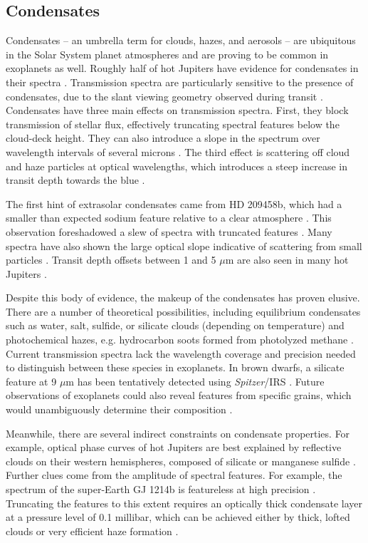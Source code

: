 \documentclass[graybox,natbib,nosecnum]{svmult}
\newcommand{\project}[1]{\textsl{#1}}
\newcommand{\Spitzer}{\project{Spitzer}}
\begin{document}
\subsection{Condensates}
Condensates -- an umbrella term for clouds, hazes, and aerosols -- are ubiquitous in the Solar System planet atmospheres and are proving to be common in exoplanets as well. Roughly half of hot Jupiters have evidence for condensates in their spectra \citep{sing16}. Transmission spectra are particularly sensitive to the presence of condensates, due to the slant viewing geometry observed during transit \citep{fortney05}.  Condensates have three main effects on transmission spectra.  First, they block transmission of stellar flux, effectively truncating spectral features below the cloud-deck height.  They can also introduce a slope in the spectrum over wavelength intervals of several microns \citep[e.g][]{sing16}.  The third effect is scattering off cloud and haze particles at optical wavelengths, which introduces a steep increase in transit depth towards the blue \citep[e.g.][]{pont08}.

The first hint of extrasolar condensates came from HD 209458b, which had a smaller than expected sodium feature relative to a clear atmosphere \citep{charbonneau02}. This observation foreshadowed a slew of spectra with truncated features \citep[e.g.][]{deming13, crossfield13, kreidberg14a, knutson14a, kreidberg15b}. Many spectra have also shown the large optical slope indicative of scattering from small particles \citep[e.g][]{lecavelier08b, sing11, sing13, robinson14, dragomir15}. Transit depth offsets between 1 and 5 $\mu$m are also seen in many hot Jupiters \citep{sing16}.

Despite this body of evidence, the makeup of the condensates has proven elusive. There are a number of theoretical possibilities, including equilibrium condensates such as water, salt, sulfide, or silicate clouds (depending on temperature) and photochemical hazes, e.g. hydrocarbon soots formed from photolyzed methane \citep{burrows99, kempton12, morley13, wakeford17}. Current transmission spectra lack the wavelength coverage and precision needed to distinguish between these species in exoplanets.  In brown dwarfs, a silicate feature at 9 $\mu$m has been tentatively detected using \Spitzer/IRS \citep{cushing06}. Future observations of exoplanets could also reveal features from specific grains, which would unambiguously determine their composition \citep{wakeford15}.

Meanwhile, there are several indirect constraints on condensate properties.  For example, optical phase curves of hot Jupiters are best explained by reflective clouds on their western hemispheres, composed of silicate or manganese sulfide \citep{demory13, oreshenko16, parmentier16}. Further clues come from the amplitude of spectral features. For example, the spectrum of the super-Earth GJ 1214b is featureless at high precision \citep[30 ppm,][]{kreidberg14a}.  Truncating the features to this extent requires an optically thick condensate layer at a pressure level of 0.1 millibar, which can be achieved either by thick, lofted clouds or very efficient haze formation \citep{morley15}. 
\end{document}
